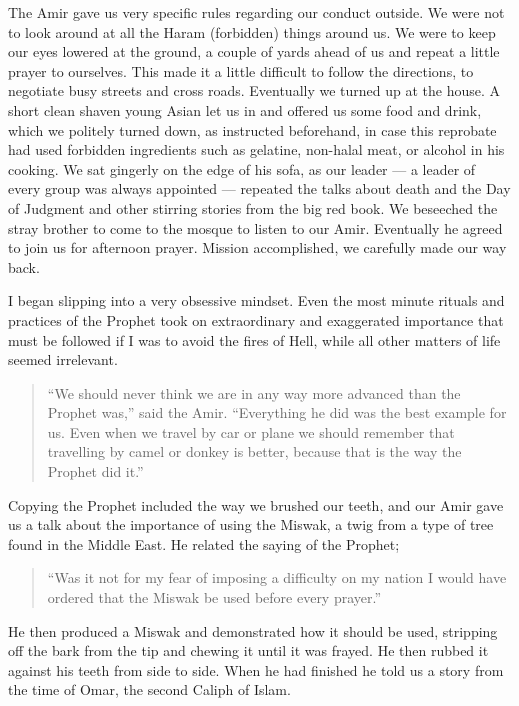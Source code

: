 \documentclass[12pt]{memoir}
\begin{document}
The Amir gave us very specific rules regarding our conduct outside.
We were not to look around at all the Haram (forbidden) things around us.
We were to keep our eyes lowered at the ground,
a couple of yards ahead of us and repeat a little prayer to ourselves.
This made it a little difficult to follow the directions,
to negotiate busy streets and cross roads.
Eventually we turned up  at the house.
A short clean shaven young Asian let us in and offered us some food and drink,
which we politely turned down, as instructed beforehand,
in case this reprobate had used forbidden ingredients such as gelatine,
non-halal meat, or alcohol in his cooking.
We sat gingerly on the edge of his sofa, as our leader —
a leader of every group was always appointed —
repeated the talks about death and the Day of Judgment
and other stirring stories from the big red book.
We beseeched the stray brother to come to the mosque to listen to our Amir.
Eventually he agreed to join us for afternoon prayer.
Mission accomplished, we carefully made our way back.

I began slipping into a very obsessive mindset.
Even the most minute rituals and practices of the Prophet
took on extraordinary and exaggerated importance
that must be followed if I was to avoid the fires of Hell,
while all other matters of life seemed irrelevant.

\begin{quote}
“We should never think we are in any way more advanced
than the Prophet was,” said the Amir.
“Everything he did was the best example for us.
Even when we travel by car or plane we should remember
that travelling by camel or donkey is better,
because that is the way the Prophet did it.”
\end{quote}

Copying the Prophet included the way we brushed our teeth,
and our Amir gave us a talk about the importance of using the Miswak,
a twig from a type of tree found in the Middle East.
He related the saying of the Prophet;

\begin{quote}
“Was it not for my fear of imposing a difficulty on my nation
I would have ordered that the Miswak be used before every prayer.”
\end{quote}

He then produced a Miswak and demonstrated how it should be used,
stripping off the bark from the tip and chewing it until it was frayed.
He then rubbed it against his teeth from side to side.
When he had finished he told us a story from the time of Omar,
the second Caliph of Islam.
\end{document}
